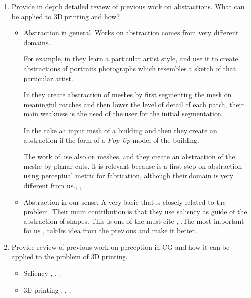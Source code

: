 \begin{enumerate}
	\item Provide in depth detailed review of previous work on abstractions. What can be applied to 3D printing and how?
	
	\begin{itemize}
		\item Abstraction in general. Works on abstraction comes from very different domains. 
		
		For example, in \cite{Berger2013} they learn a particular artist style, and use it to create abstractions of portraits photographs which resembles a sketch of that particular artist.
		
		In \cite{DeGoes2011} they create abstraction of meshes by first segmenting the mesh on meaningful patches and then lower the level of detail of each patch, their main weakness is the need of the user for the initial segmentation. 
		
		In \cite{Li2010} the take an input mesh of a building and then they create an abstraction if the form of a \emph{Pop-Up} model of the building. 
		
		The work of \cite{Hildebrand2012} use also on meshes, and they create an abstraction of the meshe by planar cuts.
		it is relevant because is a first step on abstraction using perceptual metric for fabrication, although their domain is very different from us., \cite{McCrae2011}, 
		\item Abstraction in our sense. A very basic \cite{Yang2009} that is closely related to the problem. Their main contribution is that they use saliency as guide of the abstraction of shapes. This is one of the must cite \cite{Mehra2009}, ,The most important for us \cite{Yumer2012}, tak4es idea from the previous and make it better.
	\end{itemize}

  \item Provide review of previous work on perception in CG and how it can be applied to the problem of 3D printing.
	
	\begin{itemize}
		\item Saliency \cite{Nan2011}, \cite{Wu2013}, \cite{Feixas2009}. \cite{Kim2010}
		\item 3D printing \cite{Echevarria2014}, \cite{Wang2015} \cite{Stava2012}, \cite{Torkhani2015},
	\end{itemize}


\end{enumerate}
